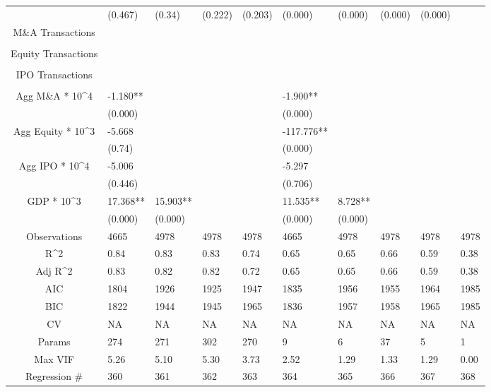 \documentclass{article}
\begin{document}
\begin{table}[H]
\begin{tabular}{|clllllllll|}
   & (0.467) & (0.34) & (0.222) & (0.203) & (0.000) & (0.000) & (0.000) & (0.000) &  \\
  M\&A Transactions &  &  &  &  &  &  &  &  &  \\
   &  &  &  &  &  &  &  &  &  \\
  Equity Transactions &  &  &  &  &  &  &  &  &  \\
   &  &  &  &  &  &  &  &  &  \\
  IPO Transactions &  &  &  &  &  &  &  &  &  \\
   &  &  &  &  &  &  &  &  &  \\
  Agg M\&A * 10^4 & -1.180** &  &  &  & -1.900** &  &  &  &  \\
   & (0.000) &  &  &  & (0.000) &  &  &  &  \\
  Agg Equity * 10^3 & -5.668 &  &  &  & -117.776** &  &  &  &  \\
   & (0.74) &  &  &  & (0.000) &  &  &  &  \\
  Agg IPO * 10^4 & -5.006 &  &  &  & -5.297 &  &  &  &  \\
   & (0.446) &  &  &  & (0.706) &  &  &  &  \\
  GDP * 10^3 & 17.368** & 15.903** &  &  & 11.535** & 8.728** &  &  &  \\
   & (0.000) & (0.000) &  &  & (0.000) & (0.000) &  &  &  \\
  \hline
 Observations & 4665 & 4978 & 4978 & 4978 & 4665 & 4978 & 4978 & 4978 & 4978 \\
  R^2 & 0.84 & 0.83 & 0.83 & 0.74 & 0.65 & 0.65 & 0.66 & 0.59 & 0.38 \\
  Adj R^2 & 0.83 & 0.82 & 0.82 & 0.72 & 0.65 & 0.65 & 0.66 & 0.59 & 0.38 \\
  AIC & 1804 & 1926 & 1925 & 1947 & 1835 & 1956 & 1955 & 1964 & 1985 \\
  BIC & 1822 & 1944 & 1945 & 1965 & 1836 & 1957 & 1958 & 1965 & 1985 \\
  CV & NA & NA & NA & NA & NA & NA & NA & NA & NA \\
  Params & 274 & 271 & 302 & 270 & 9 & 6 & 37 & 5 & 1 \\
  Max VIF & 5.26 & 5.10 & 5.30 & 3.73 & 2.52 & 1.29 & 1.33 & 1.29 & 0.00 \\
  Regression \# & 360 & 361 & 362 & 363 & 364 & 365 & 366 & 367 & 368 \\
   \hline
\end{tabular}

\end{table}
\end{document}
